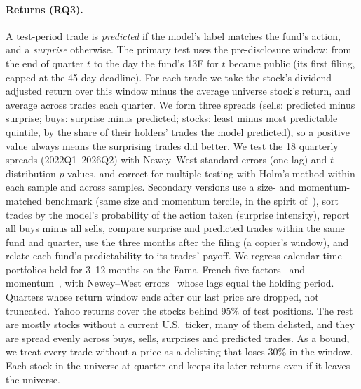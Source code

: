 \paragraph{Returns (RQ3).} A test-period trade is \emph{predicted} if the
model's label matches the fund's action, and a \emph{surprise} otherwise. The
primary test uses the pre-disclosure window: from the end of quarter $t$ to the
day the fund's 13F for $t$ became public (its first filing, capped at the
45-day deadline). For each trade we take the stock's dividend-adjusted return
over this window minus the average universe stock's return, and average across
trades each quarter. We form three spreads (sells: predicted minus surprise;
buys: surprise minus predicted; stocks: least minus most predictable quintile,
by the share of their holders' trades the model predicted), so a positive
value always means the surprising trades did better. We test the 18
quarterly spreads (2022Q1--2026Q2) with Newey--West standard errors (one lag)
and $t$-distribution $p$-values, and correct for multiple testing with Holm's
method within each sample and across samples. Secondary versions use a size-
and momentum-matched benchmark (same size and momentum tercile, in the spirit
of~\cite{daniel1997measuring}), sort trades by the model's probability of the
action taken (surprise intensity), report all buys minus all sells, compare
surprise and predicted trades within the same fund and quarter, use the
three months after the filing (a copier's window), and relate each fund's predictability to its trades' payoff. We
regress calendar-time portfolios held for 3--12 months on the Fama--French
five factors~\cite{fama2015five} and momentum~\cite{carhart1997persistence},
with Newey--West errors~\cite{newey1987hac} whose lags equal the holding
period. Quarters whose return window ends after our last price are dropped,
not truncated. Yahoo returns cover the stocks behind 95\% of test positions. The rest
are mostly stocks without a current U.S.\ ticker, many of them delisted, and
they are spread evenly across buys, sells, surprises and predicted trades. As
a bound, we treat every trade without a price as a delisting that loses 30\%
in the window. Each stock in the universe at quarter-end keeps its later
returns even if it leaves the universe.
